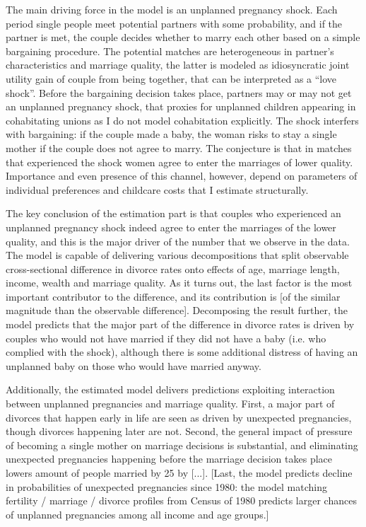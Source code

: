 \documentclass[12pt,letter]{article}
\begin{document}
The main driving force in the model is an unplanned pregnancy shock. Each period single people meet potential partners with some probability, and if the partner is met, the couple decides whether to marry each other based on a simple bargaining procedure. The potential matches are heterogeneous in partner's characteristics and marriage quality, the latter is modeled as idiosyncratic joint utility gain of couple from being together, that can be interpreted as a ``love shock''.  Before the bargaining decision takes place, partners may or may not get an unplanned pregnancy shock, that proxies for unplanned children appearing in cohabitating unions as I do not model cohabitation explicitly. The shock interfers with bargaining: if the couple made a baby, the woman risks to stay a single mother if the couple does not agree to marry. The conjecture is that in matches that experienced the shock women agree to enter the marriages of lower quality. Importance and even presence of this channel, however, depend on parameters of individual preferences and childcare costs that I estimate structurally.

The key conclusion of the estimation part is that couples who experienced an unplanned pregnancy shock indeed agree to enter the marriages of the lower quality, and this is the major driver of the number that we observe in the data. The model is capable of delivering various decompositions that split observable cross-sectional difference in divorce rates onto effects of age, marriage length, income, wealth and marriage quality. As it turns out, the last factor is the most important contributor to the difference, and its contribution is [of the similar magnitude than the observable difference]. Decomposing the result further, the model predicts that the major part of the difference in divorce rates is driven by couples who would not have married if they did not have a baby (i.e. who complied with the shock), although there is some additional distress of having an unplanned baby on those who would have married anyway.

Additionally, the estimated model delivers predictions exploiting interaction between unplanned pregnancies and marriage quality. First, a major part of divorces that happen early in life are seen as driven by unexpected pregnancies, though divorces happening later are not. Second, the general impact of pressure of becoming a single mother on marriage decisions is substantial, and eliminating unexpected pregnancies happening before the marriage decision takes place lowers amount of people married by 25 by [...]. [Last, the model predicts decline in probabilities of unexpected pregnancies since 1980: the model matching fertility / marriage / divorce profiles from Census of 1980 predicts larger chances of unplanned pregnancies among all income and age groups.]
\end{document}
